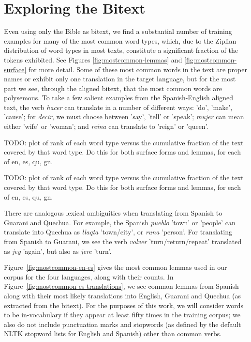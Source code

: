 \section{Exploring the Bitext}
\label{sec:exploring}
Even using only the Bible as bitext, we find a substantial number of
training examples for many of the most common word types, which, due to the
Zipfian distribution of word types in most texts, constitute a significant
fraction of the tokens exhibited. See Figures \ref{fig:mostcommon-lemmas} and
\ref{fig:mostcommon-surface} for more detail.
Some of these most common words
in the text are proper names or exhibit only one translation in the target
language, but for the most part we see, through the aligned bitext, that
the most common words are polysemous.
To take a few salient examples from the Spanish-English aligned text,
the verb \emph{hacer} can translate in a number of different ways: 'do',
'make', 'cause'; for \emph{decir}, we must choose between 'say', 'tell' or
'speak'; \emph{mujer} can mean either 'wife' or 'woman'; and \emph{reina} can
translate to 'reign' or 'queen'.  

\begin{figure*}
TODO: plot of rank of each word type versus the cumulative fraction of the text
covered by that word type. Do this for both surface forms and lemmas, for each
of en, es, qu, gn.
  \caption{Word ranks versus fraction of Bible tokens covered, for lemmas.}
  \label{fig:mostcommon-lemmas}
\end{figure*}

\begin{figure*}
TODO: plot of rank of each word type versus the cumulative fraction of the text
covered by that word type. Do this for both surface forms and lemmas, for each
of en, es, qu, gn.
  \caption{Word ranks versus fraction of Bible tokens covered, for
  (case-insensitive) surface forms.}
  \label{fig:mostcommon-lemmas}
\end{figure*}

There are analogous lexical ambiguities when translating from Spanish to
Guarani and Quechua.
For example, the Spanish \emph{pueblo} 'town' or 'people' can translate into
Quechua as \emph{llaqta} 'town/city', or \emph{runa} 'person'.
For translating from Spanish to Guarani, we see the verb \emph{volver}
'turn/return/repeat' translated as \emph{jey} 'again', but also as \emph{jere}
'turn'.

Figure~\ref{fig:mostcommon-en-es} gives the most common lemmas used in our
corpus for the four languages, along with their counts. In
Figure~\ref{fig:mostcommon-es-translations}, we see common lemmas from
Spanish along with their most likely translations into English, Guarani and
Quechua (as extracted from the bitext). For the purposes of this work, we will
consider words to be in-vocabulary if they appear at least fifty times in the
training corpus; we also do not include punctuation marks and stopwords (as
defined by the default NLTK stopword lists for English and Spanish) other than
common verbs.

